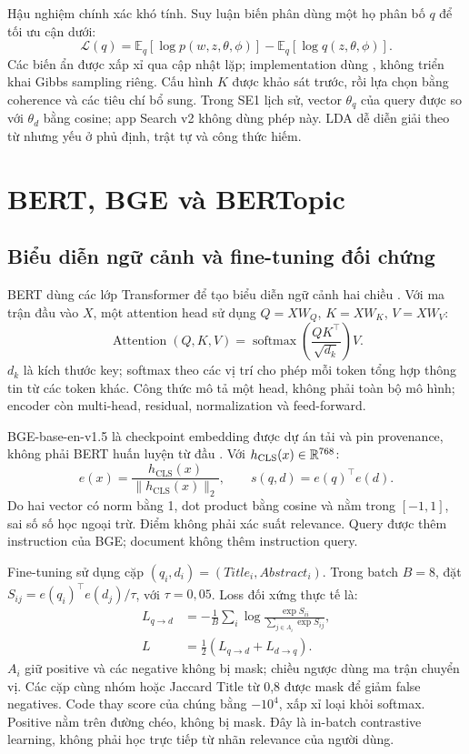 Hậu nghiệm chính xác khó tính. Suy luận biến phân dùng một họ phân bố $q$ để tối ưu cận dưới:
\begin{equation}\label{eq:elbo}
\mathcal L(q)=\mathbb E_q[\log p(w,z,\theta,\phi)]-
\mathbb E_q[\log q(z,\theta,\phi)].
\end{equation}
Các biến ẩn được xấp xỉ qua cập nhật lặp; implementation dùng , không triển khai Gibbs sampling riêng. Cấu hình $K$ được khảo sát trước, rồi lựa chọn bằng coherence và các tiêu chí bổ sung. Trong SE1 lịch sử, vector $\theta_q$ của query được so với $\theta_d$ bằng cosine; app Search v2 không dùng phép này. LDA dễ diễn giải theo từ nhưng yếu ở phủ định, trật tự và công thức hiếm.

\section{BERT, BGE và BERTopic}
\subsection{Biểu diễn ngữ cảnh và fine-tuning đối chứng}
BERT dùng các lớp Transformer để tạo biểu diễn ngữ cảnh hai chiều \cite{bert}. Với ma trận đầu vào $X$, một attention head sử dụng $Q=XW_Q$, $K=XW_K$, $V=XW_V$:
\begin{equation}\label{eq:attention}
\operatorname{Attention}(Q,K,V)=\operatorname{softmax}\left(\frac{QK^\top}{\sqrt{d_k}}\right)V.
\end{equation}
$d_k$ là kích thước key; softmax theo các vị trí cho phép mỗi token tổng hợp thông tin từ các token khác. Công thức mô tả một head, không phải toàn bộ mô hình; encoder còn multi-head, residual, normalization và feed-forward.

BGE-base-en-v1.5 là checkpoint embedding được dự án tải và pin provenance, không phải BERT huấn luyện từ đầu \cite{bge}. Với $h_{\mathrm{CLS}}(x)\in\mathbb{R}^{768}$:
\begin{equation}\label{eq:embedding}
e(x)=\frac{h_{\mathrm{CLS}}(x)}{\|h_{\mathrm{CLS}}(x)\|_2},\qquad
s(q,d)=e(q)^\top e(d).
\end{equation}
Do hai vector có norm bằng 1, dot product bằng cosine và nằm trong $[-1,1]$, sai số số học ngoại trừ. Điểm không phải xác suất relevance. Query được thêm instruction của BGE; document không thêm instruction query.

Fine-tuning sử dụng cặp $(q_i,d_i)=(Title_i,Abstract_i)$. Trong batch $B=8$, đặt $S_{ij}=e(q_i)^\top e(d_j)/\tau$, với $\tau=0,05$. Loss đối xứng thực tế là:
\begin{align}
L_{q\to d}&=-\frac1B\sum_i\log\frac{\exp S_{ii}}{\sum_{j\in A_i}\exp S_{ij}},\label{eq:contrastive}\\
L&=\tfrac12\left(L_{q\to d}+L_{d\to q}\right).\label{eq:sym-loss}
\end{align}
$A_i$ giữ positive và các negative không bị mask; chiều ngược dùng ma trận chuyển vị. Các cặp cùng nhóm hoặc Jaccard Title từ 0,8 được mask để giảm false negatives. Code thay score của chúng bằng $-10^4$, xấp xỉ loại khỏi softmax. Positive nằm trên đường chéo, không bị mask. Đây là in-batch contrastive learning, không phải học trực tiếp từ nhãn relevance của người dùng.

